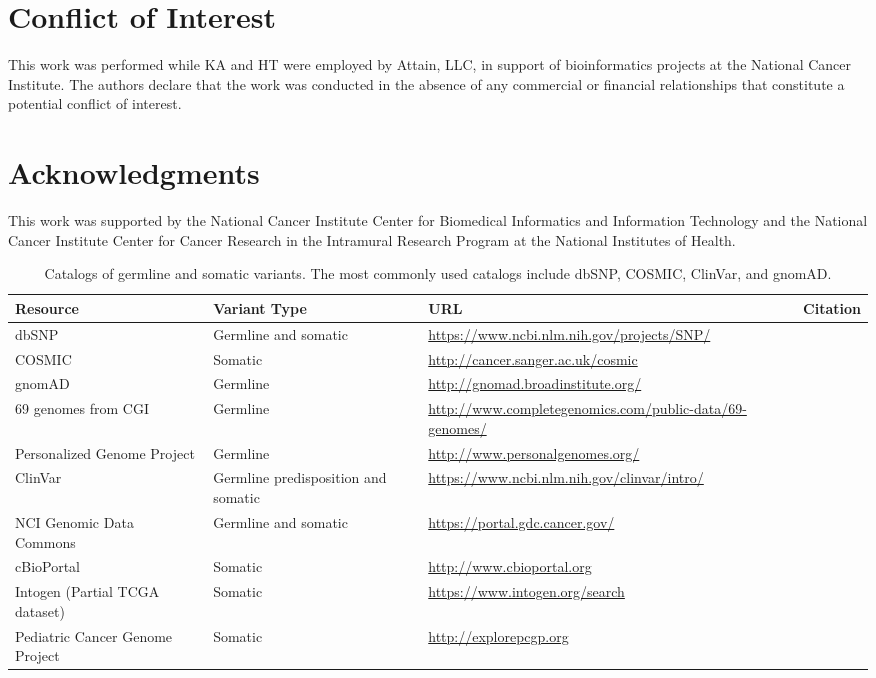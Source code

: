 \documentclass{article}
\begin{document}
\section{Conflict of Interest}

This work was performed while KA and HT were employed by Attain, LLC,
in support of bioinformatics projects at the National Cancer
Institute. The authors declare that the work was conducted in the
absence of any commercial or financial relationships that constitute a
potential conflict of interest.

\section{Acknowledgments}
This work was supported by the National Cancer Institute Center for
Biomedical Informatics and Information Technology and the National
Cancer Institute Center for Cancer Research in the Intramural Research
Program at the National Institutes of Health. 

\printbibliography


\begin{table}[p]
\centering
\begin{tabularx}{\textwidth}{p{3.5cm}p{2cm}Xp{3cm}}
  \toprule
  Resource & Variant Type & URL & Citation \\
  \midrule
  dbSNP & Germline and somatic &
  \url{https://www.ncbi.nlm.nih.gov/projects/SNP/} &
  \parencite{Sherry2001-li} \\
  COSMIC & Somatic & \url{http://cancer.sanger.ac.uk/cosmic} &
  \parencite{Reva2011-en} \\
  gnomAD  & Germline & \url{http://gnomad.broadinstitute.org/} & \parencite{Lek2016-bb} \\
  69 genomes from CGI & Germline & \url{http://www.completegenomics.com/public-data/69-genomes/} & \parencite{Drmanac2010-od} \\
  Personalized Genome Project & Germline & \url{http://www.personalgenomes.org/} & \parencite{Church2005-lr} \\
  ClinVar & Germline predisposition and somatic & \url{https://www.ncbi.nlm.nih.gov/clinvar/intro/} & \parencite{Landrum2016-ul} \\
  NCI Genomic Data Commons & Germline and somatic & \url{https://portal.gdc.cancer.gov/} & \parencite{Grossman2016-sk} \\
  cBioPortal & Somatic & \url{http://www.cbioportal.org} & \parencite{Cerami2012-el,Gao2013-li} \\
  Intogen (Partial TCGA dataset) & Somatic & \url{https://www.intogen.org/search} & \parencite{Rubio-Perez2015-ek,Gonzalez-Perez2013-cl} \\
  Pediatric Cancer Genome Project  & Somatic & \url{http://explorepcgp.org} & \parencite{Downing2012-do} \\
   \bottomrule
\end{tabularx}
\caption{Catalogs of germline and somatic variants. The most commonly
  used catalogs include dbSNP, COSMIC, ClinVar, and gnomAD.}
\label{table:1}
\end{table}
\end{document}
